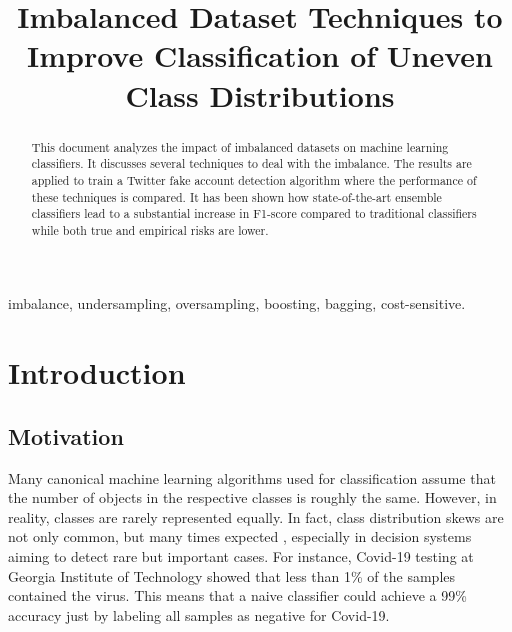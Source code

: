 \documentclass[conference]{IEEEtran}
\begin{document}
\title{Imbalanced Dataset Techniques to Improve Classification of Uneven Class Distributions\\
}

\author{
\and
{}
\and
{}
}

\maketitle

\begin{abstract}
This document analyzes the impact of imbalanced datasets on machine learning classifiers. It discusses several techniques to deal with the imbalance. The results are applied to train a Twitter fake account detection algorithm where the performance of these techniques is compared. It has been shown how state-of-the-art ensemble classifiers lead to a substantial increase in F1-score compared to traditional classifiers while both true and empirical risks are lower. 
\end{abstract}

\begin{IEEEkeywords}
imbalance, undersampling, oversampling, boosting, bagging, cost-sensitive.
\end{IEEEkeywords}

\section{Introduction}
	\subsection{Motivation}
	Many canonical machine learning algorithms used for classification assume that the number of objects in the respective classes is roughly the same. However, in reality, classes are rarely represented equally. In fact, class distribution skews are not only common, but many times expected \cite{data_imbalance_overview}, especially in decision systems aiming to detect rare but important cases. For instance, Covid-19 testing at Georgia Institute of Technology showed that less than 1\% of the samples contained the virus. This means that a naive classifier could achieve a 99\% accuracy just by labeling all samples as negative for Covid-19.
	
\end{document}
